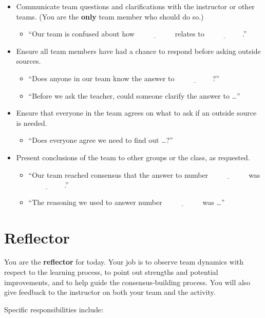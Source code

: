 \documentclass[12pt]{article}
\newcommand{\blank}{\ensuremath{\underline{\phantom{XXXXXX}}}\xspace}
\begin{document}
\begin{itemize}
\item Communicate team questions and clarifications with the instructor
  or other teams.  (You are the \textbf{only} team member who should
  do so.)
  \begin{itemize}
  \item ``Our team is confused about how \blank relates to \blank.''
  \end{itemize}
\item Ensure all team members have had a chance to respond before
  asking outside sources.
  \begin{itemize}
  \item ``Does anyone in our team know the answer to \blank?''
  \item ``Before we ask the teacher, could someone clarify the answer
    to \dots''
  \end{itemize}
\item Ensure that everyone in the team agrees on what to ask if an
  outside source is needed.
  \begin{itemize}
  \item ``Does everyone agree we need to find out \dots?''
  \end{itemize}
\item Present conclusions of the team to other groups or the class, as
  requested.
  \begin{itemize}
  \item ``Our team reached consensus that the answer to number \blank was \blank.''
  \item ``The reasoning we used to answer number \blank was \dots''
  \end{itemize}
\end{itemize}

\newpage
\section*{Reflector}

You are the \textbf{reflector} for today.  Your job is to observe team
dynamics with respect to the learning process, to point out strengths
and potential improvements, and to help guide the consensus-building
process.  You will also give feedback to the instructor on both your
team and the activity.

Specific responsibilities include:
\end{document}
